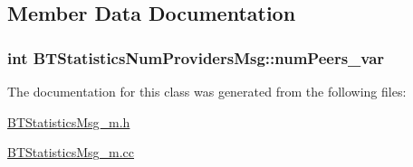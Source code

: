 \subsection{Member Data Documentation}
\hypertarget{classBTStatisticsNumProvidersMsg_a245be09caa91893aebd3db42d5bc0e9d}{}
\subsubsection[{num\+Peers\+\_\+var}]{\setlength{\rightskip}{0pt plus 5cm}int B\+T\+Statistics\+Num\+Providers\+Msg\+::num\+Peers\+\_\+var\hspace{0.3cm}{\ttfamily [protected]}}\label{classBTStatisticsNumProvidersMsg_a245be09caa91893aebd3db42d5bc0e9d}


The documentation for this class was generated from the following files\+:\begin{DoxyCompactItemize}
\item 
\hyperlink{BTStatisticsMsg__m_8h}{B\+T\+Statistics\+Msg\+\_\+m.\+h}\item 
\hyperlink{BTStatisticsMsg__m_8cc}{B\+T\+Statistics\+Msg\+\_\+m.\+cc}\end{DoxyCompactItemize}
